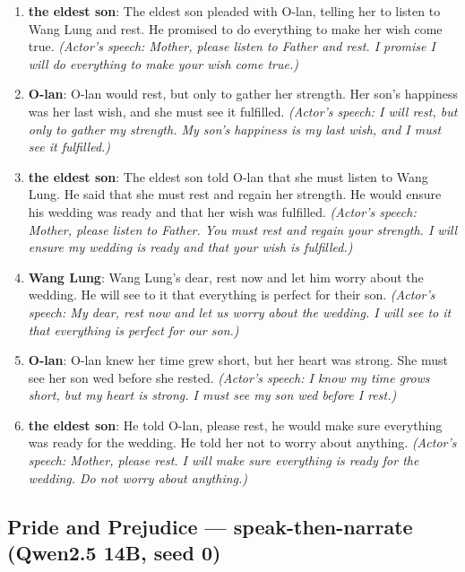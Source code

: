 \documentclass[10pt]{article}
\begin{document}
\begin{enumerate}
\item \textbf{the eldest son}: The eldest son pleaded with O-lan, telling her to listen to Wang Lung and rest. He promised to do everything to make her wish come true. \emph{(Actor's speech: Mother, please listen to Father and rest. I promise I will do everything to make your wish come true.)}

\item \textbf{O-lan}: O-lan would rest, but only to gather her strength. Her son's happiness was her last wish, and she must see it fulfilled. \emph{(Actor's speech: I will rest, but only to gather my strength. My son's happiness is my last wish, and I must see it fulfilled.)}

\item \textbf{the eldest son}: The eldest son told O-lan that she must listen to Wang Lung. He said that she must rest and regain her strength. He would ensure his wedding was ready and that her wish was fulfilled. \emph{(Actor's speech: Mother, please listen to Father. You must rest and regain your strength. I will ensure my wedding is ready and that your wish is fulfilled.)}

\item \textbf{Wang Lung}: Wang Lung's dear, rest now and let him worry about the wedding. He will see to it that everything is perfect for their son. \emph{(Actor's speech: My dear, rest now and let us worry about the wedding. I will see to it that everything is perfect for our son.)}

\item \textbf{O-lan}: O-lan knew her time grew short, but her heart was strong. She must see her son wed before she rested. \emph{(Actor's speech: I know my time grows short, but my heart is strong. I must see my son wed before I rest.)}

\item \textbf{the eldest son}: He told O-lan, please rest, he would make sure everything was ready for the wedding. He told her not to worry about anything. \emph{(Actor's speech: Mother, please rest. I will make sure everything is ready for the wedding. Do not worry about anything.)}

\end{enumerate}

\subsection*{Pride and Prejudice --- speak-then-narrate (Qwen2.5 14B, seed 0)}
\end{document}
